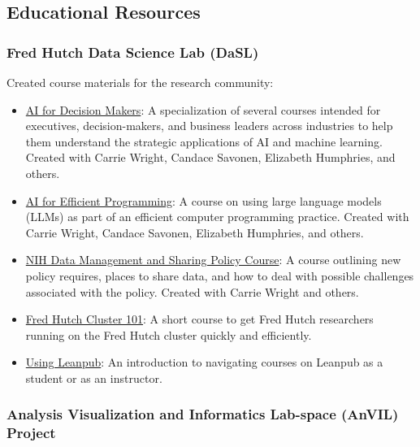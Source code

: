 \documentclass{cv}
\begin{document}
\subsection*{Educational Resources}

\subsubsection*{Fred Hutch Data Science Lab (DaSL)}

Created course materials for the research community: 

\begin{itemize}

\item \href{https://hutchdatascience.org/AI_for_Decision_Makers/}{AI for Decision Makers}: A specialization of several courses intended for executives, decision-makers, and business leaders across industries to help them understand the strategic applications of AI and machine learning. Created with Carrie Wright, Candace Savonen, Elizabeth Humphries, and others.

\item \href{https://hutchdatascience.org/AI_for_Efficient_Programming/}{AI for Efficient Programming}: A course on using large language models (LLMs) as part of an efficient computer programming practice. Created with Carrie Wright, Candace Savonen, Elizabeth Humphries, and others.

\item \href{https://hutchdatascience.org/NIH_Data_Sharing/}{NIH Data Management and Sharing Policy Course}: A course outlining new policy requires, places to share data, and how to deal with possible challenges associated with the policy. Created with Carrie Wright and others.

\item \href{https://hutchdatascience.org/FH_Cluster_Guide/}{Fred Hutch Cluster 101}: A short course to get Fred Hutch researchers running on the Fred Hutch cluster quickly and efficiently.

\item \href{https://hutchdatascience.org/Using_Leanpub/}{Using Leanpub}: An introduction to navigating courses on Leanpub as a student or as an instructor.

\end{itemize}

\subsubsection*{Analysis Visualization and Informatics Lab-space (AnVIL) Project}
\end{document}
